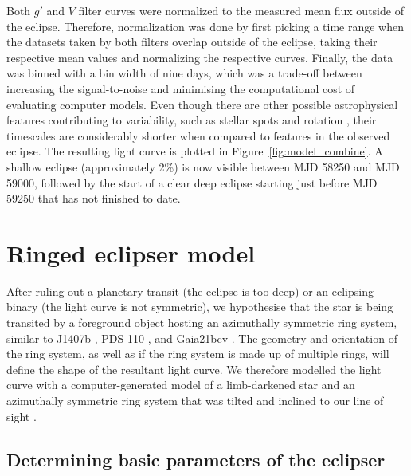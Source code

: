 \documentclass[letter]{aa} %
\begin{document}
Both $g'$ and $V$ filter curves were normalized to the measured mean flux outside of the eclipse.
%
Therefore, normalization was done by first picking a time range when the datasets taken by both filters overlap outside of the eclipse, taking their respective mean values and normalizing the respective curves.
%
Finally, the data was binned with a bin width of nine days, which was a trade-off between increasing the signal-to-noise and minimising the computational cost of evaluating computer models.
%
Even though there are other possible astrophysical features contributing to variability, such as stellar spots and rotation \citep{balona_rotational_2016, balona_starspots_2017, sikora_mobster_2019}, their timescales are considerably shorter when compared to features in the observed eclipse.
%
The resulting light curve is plotted in Figure~\ref{fig:model_combine}.
%
A shallow eclipse (approximately 2\%) is now visible between MJD 58250 and MJD 59000, followed by the start of a clear deep eclipse starting just before MJD 59250 that has not finished to date.

\section{Ringed eclipser model}

After ruling out a planetary transit (the eclipse is too deep) or an eclipsing binary (the light curve is not symmetric), we hypothesise that the star is being transited by a foreground object hosting an azimuthally symmetric ring system, similar to J1407b \citep{Mamajek12, Kenworthy_2015}, PDS 110 \citep{Osborn17}, and Gaia21bcv \citep{Hodapp24}.
The geometry and orientation of the ring system, as well as if the ring system is made up of multiple rings, will define the shape of the resultant light curve.
%
We therefore modelled the light curve with a computer-generated model of a limb-darkened star and an azimuthally symmetric ring system that was tilted and inclined to our line of sight \citep[using the {\tt exorings} package;][]{2015ascl.soft01012K}. 

\subsection{Determining basic parameters of the eclipser}
\label{sec:model_building}
\end{document}
